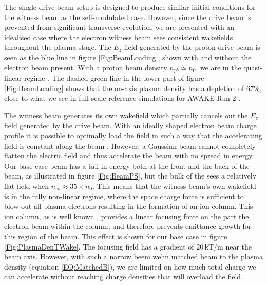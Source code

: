 \documentclass[aps,prstab,reprint,amsmath,amssymb,groupedaddress]{revtex4-1}
\newcommand{\unit}[1]{\,\mathrm{#1}}
\begin{document}
The single drive beam setup is designed to produce similar initial conditions for the witness beam as the self-modulated
case. However, since the drive beam is prevented from significant transverse evolution, we are presented with an
idealised case where the electron witness beam sees consistent wakefields throughout the plasma stage. The $E_{z}$-field
generated by the proton drive beam is seen as the blue line in figure \ref{Fig:BeamLoading}, shown with and without the
electron beam present. With a proton beam density $n_{pb} \simeq n_{0}$, we are in the quasi-linear regime
\cite{rosenzweig:2010}. The dashed green line in the lower part of figure \ref{Fig:BeamLoading} shows that the on-axis
plasma density has a depletion of $67\%$, close to what we see in full scale reference simulations for AWAKE Run 2
\cite{awake_collaboration:2016}.


The witness beam generates its own wakefield which partially cancels out the $E_{z}$ field generated by the drive beam.
With an ideally shaped electron beam charge profile it is possible to optimally load the field in such a way that the
accelerating field is constant along the beam \cite{katsouleas:1987, tzoufras:2009}. However, a Gaussian beam cannot
completely flatten the electric field and thus accelerate the beam with no spread in energy. Our base case beam has a
tail in energy both at the front and the back of the beam, as illustrated in figure \ref{Fig:BeamPS}, but the bulk of
the sees a relatively flat field when $n_{eb} \approx 35\times n_{0}$. This means that the witness beam's own wakefield
is in the fully non-linear regime, where the space charge force is sufficient to blow-out all plasma electrons resulting
in the formation of an ion column. This ion column, as is well known \cite{rosenzweig:1991}, provides a linear focusing
force on the part the electron beam within the column, and therefore prevents emittance growth for this region of the
beam. This effect is shown for our base case in figure \ref{Fig:PlasmaDenTWake}. The focusing field has a gradient of
$20\unit{kT/m}$ near the beam axis. However, with such a narrow beem wehn matched beam to the plasma density (equation
\ref{EQ:MatchedB}), we are limited on how much total charge we can accelerate without reaching charge densities that
will overload the field.
\end{document}
